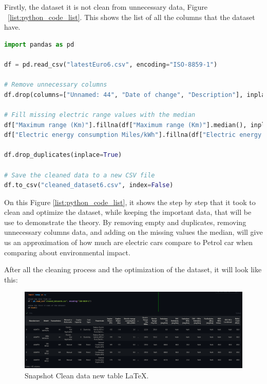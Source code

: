 Firstly, the dataset it is not clean from unnecessary data, Figure ~\ref{list:python_code_list}. This shows the list of all the columns that the dataset have.

\begin{lstlisting}[language=Python, caption={Code snippet in \LaTeX ~and  this is a Python code, removind unnesesary data }, label=list:python_code_list]
import pandas as pd

df = pd.read_csv("latestEuro6.csv", encoding="ISO-8859-1")

# Remove unnecessary columns
df.drop(columns=["Unnamed: 44", "Date of change", "Description"], inplace=True)

# Fill missing electric range values with the median
df["Maximum range (Km)"].fillna(df["Maximum range (Km)"].median(), inplace=True)
df["Electric energy consumption Miles/kWh"].fillna(df["Electric energy consumption Miles/kWh"].median(), inplace=True)

df.drop_duplicates(inplace=True)

# Save the cleaned data to a new CSV file
df.to_csv("cleaned_dataset6.csv", index=False)

\end{lstlisting}

On this Figure \ref{list:python_code_list}, it shows the step by step that it took to clean and optimize the dataset, while keeping the important data, that will be use to demonstrate the theory. By removing empty and duplicates, removing unnecessary columns data, and adding on the missing values the median, will give us an approximation of how much are electric cars compare to Petrol car when comparing about environmental impact.


After all the cleaning process and the optimization of the dataset, it will look like this:
\begin{figure}[H]
    \centering
    \includegraphics[scale=0.35]{figures/CleanData.png}
    \caption{Snapshot Clean data new table \LaTeX.}
    \label{fig:chart_2}
\end{figure}

